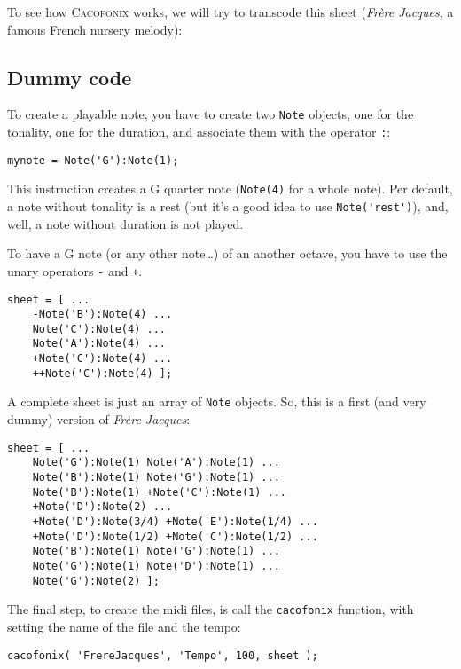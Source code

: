 \documentclass{article}
\newcommand{\cacofonix}{\textsc{Cacofonix}\xspace}
\newcommand{\note}{\lstinline!Note!\xspace}
\newcommand{\frerejaques}{\emph{Fr\`ere Jacques}\xspace}
\begin{document}
To see how \cacofonix works, we will try to transcode this sheet (\frerejaques, a famous French nursery melody):\\

\subsection{Dummy code}

To create a playable note, you have to create two \note objects, one for the tonality, one for the duration, and associate them with the operator \lstinline!:!:
\begin{lstlisting}
mynote = Note('G'):Note(1);
\end{lstlisting}
This instruction creates a G quarter note (\lstinline!Note(4)! for a whole note). Per default, a note without tonality is a rest (but it's a good idea to use \lstinline!Note('rest')!), and, well, a note without duration is not played.

To have a G note (or any other note\dots) of an another octave, you have to use the unary operators \lstinline!-! and \lstinline!+!. \\
\begin{lstlisting}
sheet = [ ...
	-Note('B'):Note(4) ...
	Note('C'):Note(4) ...
	Note('A'):Note(4) ...
	+Note('C'):Note(4) ...
	++Note('C'):Note(4) ];
\end{lstlisting}

A complete sheet is just an array of \note objects. So, this is a first (and very dummy) version of \frerejaques:
\begin{lstlisting}
sheet = [ ...
	Note('G'):Note(1) Note('A'):Note(1) ...
	Note('B'):Note(1) Note('G'):Note(1) ...
	Note('B'):Note(1) +Note('C'):Note(1) ...
	+Note('D'):Note(2) ...
	+Note('D'):Note(3/4) +Note('E'):Note(1/4) ...
	+Note('D'):Note(1/2) +Note('C'):Note(1/2) ...
	Note('B'):Note(1) Note('G'):Note(1) ...
	Note('G'):Note(1) Note('D'):Note(1) ...
	Note('G'):Note(2) ];
\end{lstlisting}

The final step, to create the midi files, is call the \lstinline!cacofonix! function, with setting the name of the file and the tempo:
\begin{lstlisting}
cacofonix( 'FrereJacques', 'Tempo', 100, sheet );
\end{lstlisting}
\end{document}
